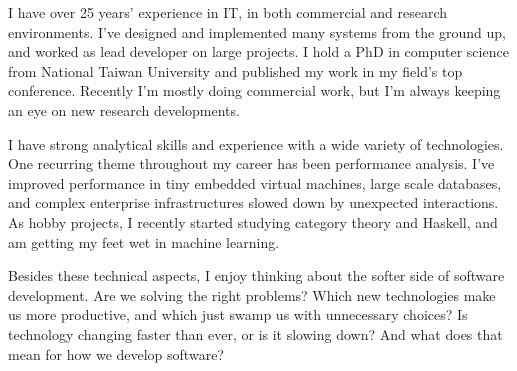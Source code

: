 \documentclass[10pt,a4paper]{../altacv}
\begin{document}

\begin{fullwidth}
\makecvheader

I have over 25 years’ experience in IT, in both commercial and research environments. I’ve designed and implemented many systems from the ground up, and worked as lead developer on large projects. I hold a PhD in computer science from National Taiwan University and published my work in my field’s top conference. Recently I'm mostly doing commercial work, but I’m always keeping an eye on new research developments.

\medskip

I have strong analytical skills and experience with a wide variety of technologies. One recurring theme throughout my career has been performance analysis. I’ve improved performance in tiny embedded virtual machines, large scale databases, and complex enterprise infrastructures slowed down by unexpected interactions. As hobby projects, I recently started studying category theory and Haskell, and am getting my feet wet in machine learning.

\medskip

Besides these technical aspects, I enjoy thinking about the softer side of software development. Are we solving the right problems? Which new technologies make us more productive, and which just swamp us with unnecessary choices? Is technology changing faster than ever, or is it slowing down? And what does that mean for how we develop software?

\end{fullwidth}


\end{document}
